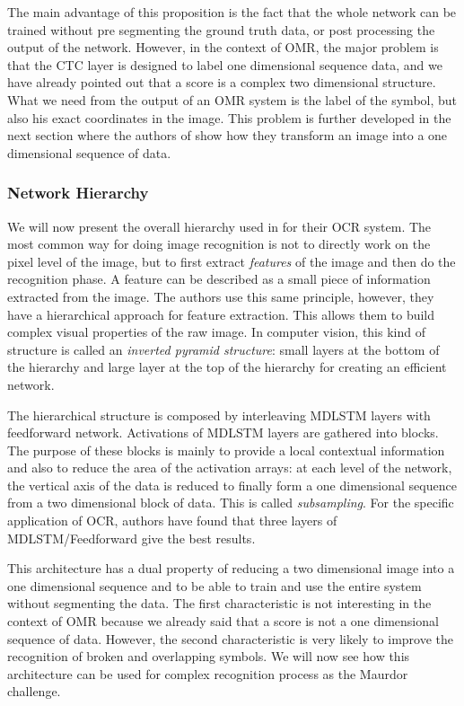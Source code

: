 \documentclass[11pt]{sdm}
\begin{document}
The main advantage of this proposition is the fact that the whole network can be trained without pre segmenting the ground truth data, or post processing the output of the network.
However, in the context of OMR, the major problem is that the CTC layer is designed to label one dimensional sequence data, and we have already pointed out that a score is a complex two dimensional structure.
What we need from the output of an OMR system is the label of the symbol, but also his exact coordinates in the image.
This problem is further developed in the next section where the authors of \cite{graves_offline_2009} show how they transform an image into a one dimensional sequence of data.

\subsubsection{Network Hierarchy}

We will now present the overall hierarchy used in \cite{graves_offline_2009} for their OCR system.
The most common way for doing image recognition is not to directly work on the pixel level of the image, but to first extract \textit{features} of the image and then do the recognition phase.
A feature can be described as a small piece of information extracted from the image.
The authors use this same principle, however, they have a hierarchical approach for feature extraction.
This allows them to build complex visual properties of the raw image.
In computer vision, this kind of structure is called an \textit{inverted pyramid structure}: small layers at the bottom of the hierarchy and large layer at the top of the hierarchy for creating an efficient network.

The hierarchical structure is composed by interleaving MDLSTM layers with feedforward network.
Activations of MDLSTM layers are gathered into blocks.
The purpose of these blocks is mainly to provide a local contextual information and also to reduce the area of the activation arrays: at each level of the network, the vertical axis of the data is reduced to finally form a one dimensional sequence from a two dimensional block of data.
This is called \textit{subsampling}.
For the specific application of OCR, authors have found that three layers of MDLSTM/Feedforward give the best results.

This architecture has a dual property of reducing a two dimensional image into a one dimensional sequence and to be able to train and use the entire system without segmenting the data.
The first characteristic is not interesting in the context of OMR because we already said that a score is not a one dimensional sequence of data.
However, the second characteristic is very likely to improve the recognition of broken and overlapping symbols.
We will now see how this architecture can be used for complex recognition process as the Maurdor challenge.
\end{document}
